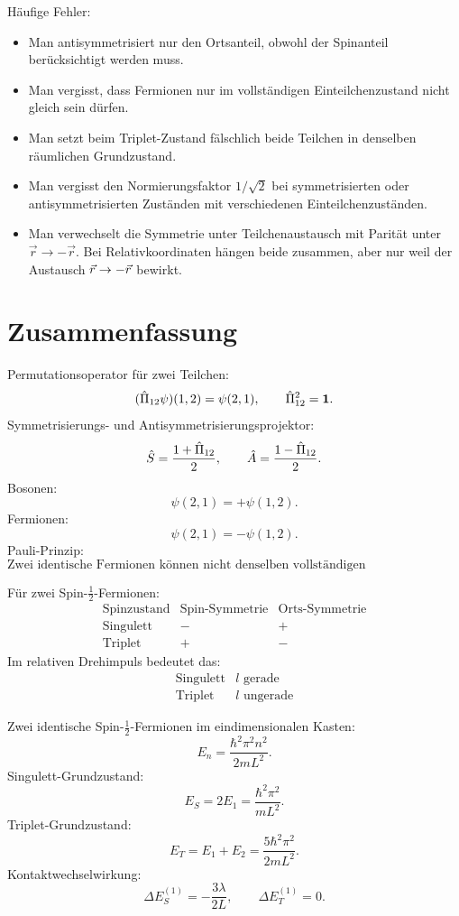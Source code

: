 \begin{notebox}
Häufige Fehler:
\begin{itemize}
    \item Man antisymmetrisiert nur den Ortsanteil, obwohl der Spinanteil berücksichtigt werden muss.
    \item Man vergisst, dass Fermionen nur im vollständigen Einteilchenzustand nicht gleich sein dürfen.
    \item Man setzt beim Triplet-Zustand fälschlich beide Teilchen in denselben räumlichen Grundzustand.
    \item Man vergisst den Normierungsfaktor \(1/\sqrt2\) bei symmetrisierten oder antisymmetrisierten Zuständen mit verschiedenen Einteilchenzuständen.
    \item Man verwechselt die Symmetrie unter Teilchenaustausch mit Parität unter \(\vec r\to-\vec r\). Bei Relativkoordinaten hängen beide zusammen, aber nur weil der Austausch \(\vec r\to-\vec r\) bewirkt.
\end{itemize}
\end{notebox}

\section{Zusammenfassung}

\begin{formulabox}
Permutationsoperator für zwei Teilchen:
\[
    (\hat\Pi_{12}\psi)(1,2)=\psi(2,1),
    \qquad
    \hat\Pi_{12}^2=\mathbf{1}.
\]
Symmetrisierungs- und Antisymmetrisierungsprojektor:
\[
    \hat S=\frac{1+\hat\Pi_{12}}{2},
    \qquad
    \hat A=\frac{1-\hat\Pi_{12}}{2}.
\]
Bosonen:
\[
    \psi(2,1)=+\psi(1,2).
\]
Fermionen:
\[
    \psi(2,1)=-\psi(1,2).
\]
Pauli-Prinzip:
\[
    \text{Zwei identische Fermionen können nicht denselben vollständigen Einteilchenzustand besetzen.}
\]
\end{formulabox}

\begin{formulabox}
Für zwei Spin-\(\frac12\)-Fermionen:
\[
\begin{array}{c|c|c}
\text{Spinzustand} & \text{Spin-Symmetrie} & \text{Orts-Symmetrie}\\
\hline
\text{Singulett} & - & +\\
\text{Triplet} & + & -
\end{array}
\]
Im relativen Drehimpuls bedeutet das:
\[
\begin{array}{c|c}
\text{Singulett} & l\text{ gerade}\\
\text{Triplet} & l\text{ ungerade}
\end{array}
\]
\end{formulabox}

\begin{formulabox}
Zwei identische Spin-\(\frac12\)-Fermionen im eindimensionalen Kasten:
\[
    E_n=\frac{\hbar^2\pi^2n^2}{2mL^2}.
\]
Singulett-Grundzustand:
\[
    E_S=2E_1=\frac{\hbar^2\pi^2}{mL^2}.
\]
Triplet-Grundzustand:
\[
    E_T=E_1+E_2=\frac{5\hbar^2\pi^2}{2mL^2}.
\]
Kontaktwechselwirkung:
\[
    \Delta E_S^{(1)}=-\frac{3\lambda}{2L},
    \qquad
    \Delta E_T^{(1)}=0.
\]
\end{formulabox}
